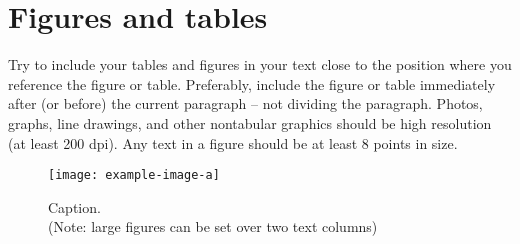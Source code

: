 \documentclass{paper}
\begin{document}
\section{Figures and tables}

Try to include your tables and figures in your text close to the position where you reference the figure or table.
Preferably, include the figure or table immediately after (or before) the current paragraph – not dividing the paragraph.
Photos, graphs, line drawings, and other nontabular graphics should be high resolution (at least 200 dpi).
Any text in a figure should be at least 8 points in size.

\begin{figure}[H]
    \centering
    \texttt{[image: example-image-a]}
    \caption{Caption.\\(Note: large figures can be set over two text columns)}
\end{figure}

\cite{watanabe2019simd}
\end{document}
